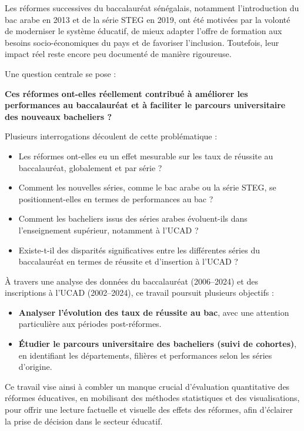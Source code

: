 Les réformes successives du baccalauréat sénégalais, notamment l’introduction du bac arabe en 2013 et de la série STEG en 2019,
ont été motivées par la volonté de moderniser le système éducatif, de mieux adapter l’offre de formation aux besoins socio-économiques du pays et de favoriser l’inclusion. 
Toutefois, leur impact réel reste encore peu documenté de manière rigoureuse.

Une question centrale se pose :

\textbf{Ces réformes ont-elles réellement contribué à améliorer les performances au baccalauréat et à faciliter le parcours universitaire des nouveaux bacheliers ?}

Plusieurs interrogations découlent de cette problématique :
\begin{itemize}
    \item Les réformes ont-elles eu un effet mesurable sur les taux de réussite au baccalauréat, globalement et par série ?
    \item Comment les nouvelles séries, comme le bac arabe ou la série STEG, se positionnent-elles en termes de performances au bac ?
    \item Comment les bacheliers issus des séries arabes évoluent-ils dans l’enseignement supérieur, notamment à l’UCAD ?
    \item Existe-t-il des disparités significatives entre les différentes séries du baccalauréat en termes de réussite et d’insertion à l'UCAD ?
\end{itemize}

À travers une analyse des données du baccalauréat (2006–2024) et des inscriptions à l’UCAD (2002–2024), ce travail poursuit plusieurs objectifs :
\begin{itemize}
    \item \textbf{Analyser l’évolution des taux de réussite au bac}, avec une attention particulière aux périodes post-réformes.
    \item \textbf{Étudier le parcours universitaire des bacheliers (suivi de cohortes)}, en identifiant les départements, filières et performances selon les séries d’origine.
\end{itemize}

Ce travail vise ainsi à combler un manque crucial d’évaluation quantitative des réformes éducatives,
en mobilisant des méthodes statistiques et des visualisations, pour offrir une lecture factuelle et visuelle des effets des réformes, afin d’éclairer la prise de décision dans le secteur éducatif.

